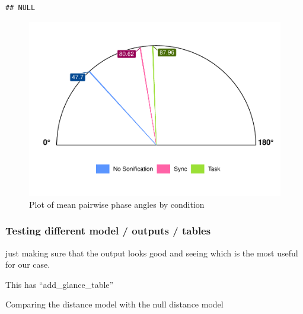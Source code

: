 \documentclass[10pt,a4paper,onecolumn]{article}
\begin{document}
\begin{verbatim}
## NULL
\end{verbatim}

\begin{figure}

{\centering \includegraphics[width=1\linewidth]{CogSci_Bachelor_Thesis_files/figure-latex/mean-instantaneous-phase-angle-circular-plot-1} 

}

\caption{Plot of mean pairwise phase angles by condition}\label{fig:mean-instantaneous-phase-angle-circular-plot}
\end{figure}

\hypertarget{testing-different-model-outputs-tables}{%
\subsubsection{Testing different model / outputs / tables}\label{testing-different-model-outputs-tables}}

just making sure that the output looks good and seeing which is the most useful for our case.

This has ``add\_glance\_table''

Comparing the distance model with the null distance model
\end{document}
